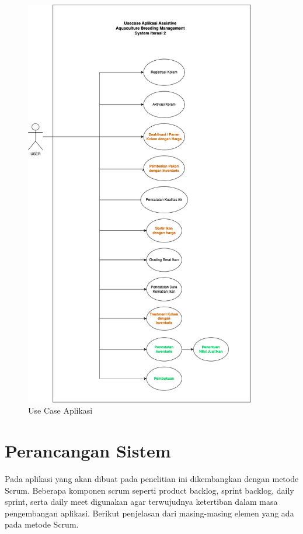 \begin{figure}[H]
	\centering
	\includegraphics[width=0.9\textwidth]{gambar/usecase_iterasi_2.png}
	\caption{Use Case Aplikasi}
\end{figure}

\section{Perancangan Sistem}

Pada aplikasi yang akan dibuat pada penelitian ini dikembangkan dengan metode Scrum. Beberapa komponen scrum seperti product backlog, sprint backlog, daily sprint, serta daily meet digunakan agar terwujudnya ketertiban dalam masa pengembangan aplikasi. Berikut penjelasan dari masing-masing elemen yang ada pada metode Scrum.

